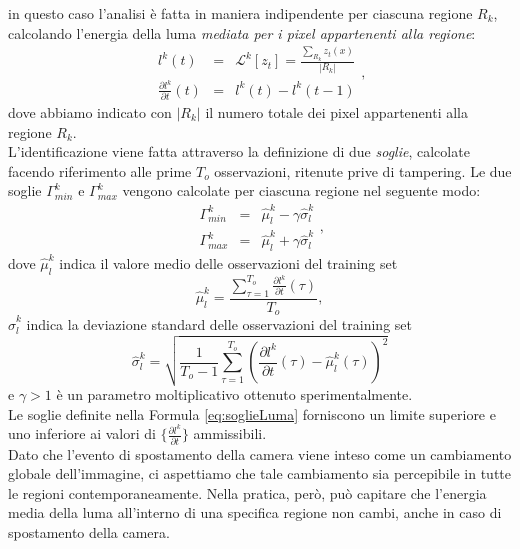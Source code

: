 in questo caso l'analisi \`e fatta in maniera indipendente per ciascuna regione $R_k$, calcolando l'energia della luma \textit{mediata per i pixel appartenenti alla regione}:
\begin{equation}
	\label{eq:lumaRegions}
	\begin{array}{ccc}
	l^k(t)&  = & \mathcal{L}^k[z_t] = \frac{\sum_{R_k} z_t(x) }{|{R_k}|}\\
	\frac{\partial l^k}{\partial t}(t) & =& l^k(t)-l^k(t-1) 
	\end{array},
\end{equation}
dove abbiamo indicato con $|{R_k}|$ il numero totale dei pixel appartenenti alla regione $R_k$.\\
L'identificazione viene fatta attraverso la definizione di due \textit{soglie}, calcolate facendo riferimento alle prime $T_{o}$ osservazioni, ritenute prive di tampering.
Le due soglie $\Gamma_{min}^k$ e $\Gamma_{max}^k$ vengono calcolate per ciascuna regione nel seguente modo:
\begin{equation}
\label{eq:soglieLuma}
\begin{array}{rcl}
\Gamma_{min}^k & = & \hat{\mu}_l^k -\gamma \hat{\sigma}_l^k\\
\Gamma_{max}^k & = & \hat{\mu}_l^k + \gamma \hat{\sigma}_l^k
\end{array},
\end{equation}
dove $\hat{\mu}_l^k$ indica il valore medio delle osservazioni del training set
\begin{equation}
\hat{\mu}_l^k = \frac{\sum_{\tau = 1}^{T_{o}} \frac{\partial l^k}{\partial t}(\tau)}{T_{o}}, \nonumber
\end{equation}
$\hat{\sigma}_l^k$ indica la deviazione standard delle osservazioni del training set
\begin{equation}
\hat{\sigma}_l^k  = \sqrt{\frac{1}{T_{o}-1}\sum_{\tau=1}^{T_{o}}\left(\frac{\partial l^k}{\partial t}(\tau) - \hat{\mu}_l^k(\tau)\right)^2} \nonumber
\end{equation}
e $\gamma>1$ \`e un parametro moltiplicativo ottenuto sperimentalmente.\\
Le soglie definite nella Formula \eqref{eq:soglieLuma} forniscono un limite superiore e uno inferiore ai valori di $\{\frac{\partial l^k}{\partial t}\}$ ammissibili.\\
Dato che l'evento di spostamento della camera viene inteso come un cambiamento globale dell'immagine, ci aspettiamo che tale cambiamento sia percepibile in tutte le regioni contemporaneamente. 
Nella pratica, per\`o, pu\`o capitare che l'energia media della luma all'interno di una specifica regione non cambi, anche in caso di spostamento della camera.
